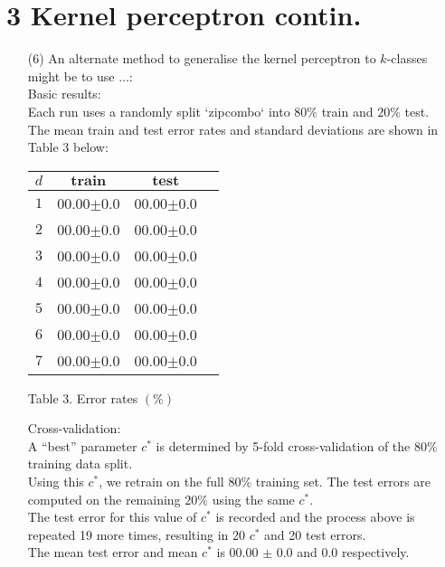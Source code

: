 \documentclass[a4paper,12pt]{article}
\begin{document}
\section*{3 Kernel perceptron contin.}
\begin{enumerate}
\item[(6)] 
An alternate method to generalise the kernel perceptron to $k$-classes might be to use ...: \\

Basic results: \\
Each run uses a randomly split `zipcombo` into $80\%$ train and $20\%$ test. \\
The mean train and test error rates and standard deviations are shown in Table 3 below:

\begin{tabular}{|c|c|c|c|}
\hline
$d$&$\textbf{train}$&$\textbf{test}$\\
\hline
$1$&00.00$\pm$0.0&00.00$\pm$0.0\\
\hline
$2$&00.00$\pm$0.0&00.00$\pm$0.0\\
\hline
$3$&00.00$\pm$0.0&00.00$\pm$0.0\\
\hline
$4$&00.00$\pm$0.0&00.00$\pm$0.0\\
\hline
$5$&00.00$\pm$0.0&00.00$\pm$0.0\\
\hline
$6$&00.00$\pm$0.0&00.00$\pm$0.0\\
\hline
$7$&00.00$\pm$0.0&00.00$\pm$0.0\\
\hline
\end{tabular}\par 
Table 3. Error rates $(\%)$

Cross-validation: \\
A “best” parameter $c^*$ is determined by 5-fold cross-validation of the $80\%$ training data split. \\
Using this $c^*$, we retrain on the full $80\%$ training set. The test errors are computed on the remaining $20\%$ using the same $c^*$. \\
The test error for this value of $c^*$ is recorded and the process above is repeated 19 more times, resulting in 20 $c^*$ and 20 test errors.\\
The mean test error and mean $c^*$ is 00.00 $\pm$ 0.0 and 0.0 respectively.


\end{enumerate}
\clearpage
\end{document}
